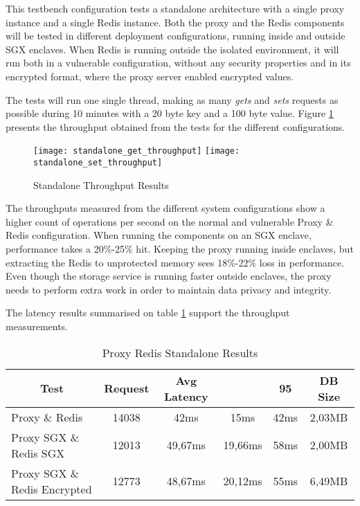 This testbench configuration tests a standalone architecture with a single proxy instance and a single Redis instance. Both the proxy and the Redis components will be tested in different deployment configurations, running inside and outside \gls{SGX} enclaves. When Redis is running outside the isolated environment, it will run both in a vulnerable configuration, without any security properties and in its encrypted format, where the proxy server enabled encrypted values.

The tests will run one single thread, making as many \textit{gets} and \textit{sets} requests as possible during 10 minutes with a 20 byte key and a 100 byte value. Figure \ref{fig:standalone_throughput_results} presents the throughput obtained from the tests for the different configurations.

\begin{figure}[htbp]
  \centering
    {\texttt{[image: standalone\_get\_throughput]}}%
    {\texttt{[image: standalone\_set\_throughput]}}%
  \caption{Standalone Throughput Results}
  \label{fig:standalone_throughput_results}
\end{figure}

The throughputs measured from the different system configurations show a higher count of operations per second on the normal and vulnerable Proxy \& Redis configuration. When running the components on an \gls{SGX} enclave, performance takes a 20\%-25\% hit. Keeping the proxy running inside enclaves, but extracting the Redis to unprotected memory sees 18\%-22\% loss in performance. Even though the storage service is running faster outside enclaves, the proxy needs to perform extra work in order to maintain data privacy and integrity.
 
The latency results summarised on table \ref{tab:proxy_redis_standalone_latency_results} support the throughput measurements.

\begin{table}[ht]
	\caption{Proxy Redis Standalone Results}
	\label{tab:proxy_redis_standalone_latency_results}
\centering
\begin{tabular}{lccccc}
	\toprule
	\multicolumn{1}{c}{\textbf{Test}} & \pmb{\#}\textbf{Request} & \textbf{Avg Latency} & \pmb{\ensuremath{\sigma}} & \textbf{95}\pmb{\%} & \textbf{DB Size} \\
	\midrule
		Proxy \& Redis & 14038 & 42ms & 15ms & 42ms & 2,03MB 	\\
		Proxy SGX \& Redis SGX & 12013 & 49,67ms & 19,66ms & 58ms & 2,00MB \\
		Proxy SGX \& Redis Encrypted & 12773 & 48,67ms & 20,12ms & 55ms & 6,49MB \\
	\bottomrule
\end{tabular}
\end{table}

